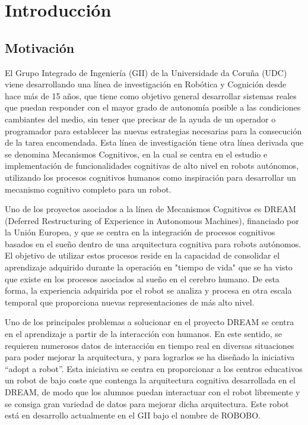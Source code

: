 \chapter{Introducción}
\label{chap:introduccion}



\section{Motivación} 
 \label{sec:intro-motivation}
 
El Grupo Integrado de Ingeniería (GII) de la Universidade da Coruña (UDC) viene desarrollando una línea de investigación en Robótica y Cognición desde hace más de 15 años, que tiene como objetivo general desarrollar sistemas reales que puedan responder con el mayor grado de autonomía posible a las condiciones cambiantes del medio, sin tener que precisar de la ayuda de un operador o programador para establecer las nuevas estrategias necesarias para la consecución de la tarea encomendada. Esta línea de investigación tiene otra línea derivada que se denomina Mecanismos Cognitivos, en la cual se centra en el estudio e implementación de funcionalidades cognitivas de alto nivel en robots autónomos, utilizando los procesos cognitivos humanos como inspiración para desarrollar un mecanismo cognitivo completo para un robot. 
 
Uno de los proyectos asociados a la línea de Mecanismos Cognitivos es DREAM\cite{dream_project} (Deferred Restructuring of Experience in Autonomous Machines), financiado por la Unión Europea, y que se centra en la integración de procesos cognitivos basados en el sueño dentro de una arquitectura cognitiva para robots autónomos. El objetivo de utilizar estos procesos reside en la capacidad de consolidar el aprendizaje adquirido durante la operación en "tiempo de vida" que se ha visto que existe en los procesos asociados al sueño en el cerebro humano. De esta forma, la experiencia adquirida por el robot se analiza y procesa en otra escala temporal que proporciona nuevas representaciones de más alto nivel. 
 
Uno de los principales problemas a solucionar en el proyecto DREAM se centra en el aprendizaje a partir de la interacción con humanos. En este sentido, se requieren numerosos datos de interacción en tiempo real en diversas situaciones para poder mejorar la arquitectura, y para lograrlos se ha diseñado la iniciativa \enquote{adopt a robot}. Esta iniciativa se centra en proporcionar a los centros educativos un robot de bajo coste que contenga la arquitectura cognitiva desarrollada en el DREAM, de modo que los alumnos puedan interactuar con el robot libremente y se consiga gran variedad de datos para mejorar dicha arquitectura. Este robot está en desarrollo actualmente en el GII bajo el nombre de ROBOBO.
 
